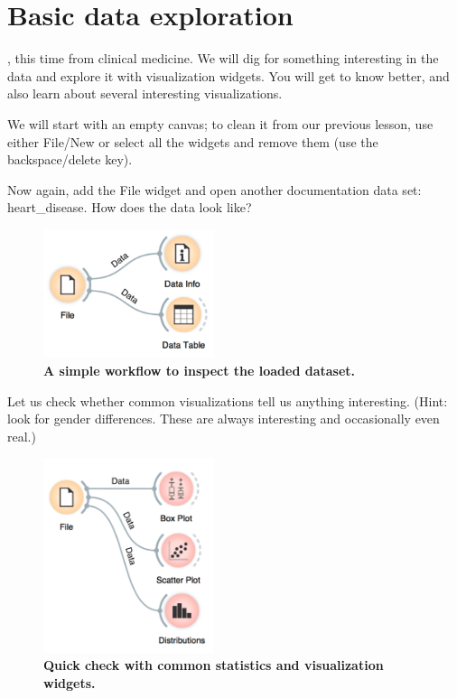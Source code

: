 \chapter{Basic data exploration}
\label{ch:basic_data_exploration}

, this time from clinical me\-di\-cine. We will dig for something interesting in the data and explore it with visualization widgets. You will get to know \mutation better, and also learn about several interesting visualizations.

We will start with an empty canvas; to clean it from our previous lesson, use either File/New or select all the widgets and remove them (use the backspace/delete key).

Now again, add the File widget and open another documentation data set: heart\_disease. How does the data look like?

\begin{figure}[h]
  \centering
  \includegraphics[width=50mm]{basic_data_exploration-fig1.png}%
  \caption{\textbf{\textsf{A simple workflow to inspect the loaded dataset.}}}
  \label{fig:basic_data_exploration-fig1}
\end{figure}

Let us check whether common visualizations tell us anything interesting. (Hint: look for gender differences. These are always interesting and occasionally even real.)

\begin{figure}[h]
  \centering
  \includegraphics[width=50mm]{basic_data_exploration-fig2.png}%
  \caption{\textbf{\textsf{Quick check with common statistics and visualization widgets.}}}
  \label{fig:basic_data_exploration-fig2}
\end{figure}

